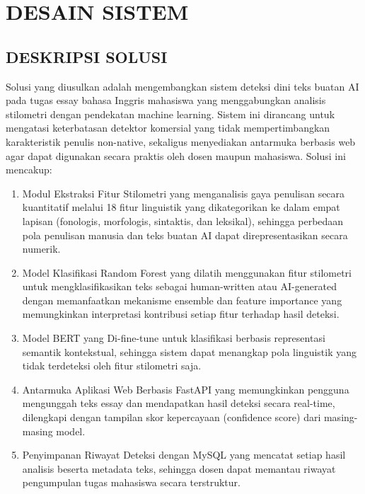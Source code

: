 \chapter{DESAIN SISTEM}

\section{DESKRIPSI SOLUSI}

Solusi yang diusulkan adalah mengembangkan sistem deteksi dini teks buatan AI pada tugas essay bahasa Inggris mahasiswa yang menggabungkan analisis stilometri dengan pendekatan machine learning. Sistem ini dirancang untuk mengatasi keterbatasan detektor komersial yang tidak mempertimbangkan karakteristik penulis non-native, sekaligus menyediakan antarmuka berbasis web agar dapat digunakan secara praktis oleh dosen maupun mahasiswa. Solusi ini mencakup:
\begin{enumerate}
	\item Modul Ekstraksi Fitur Stilometri yang menganalisis gaya penulisan secara kuantitatif melalui 18 fitur linguistik yang dikategorikan ke dalam empat lapisan (fonologis, morfologis, sintaktis, dan leksikal), sehingga perbedaan pola penulisan manusia dan teks buatan AI dapat direpresentasikan secara numerik.
	\item Model Klasifikasi Random Forest yang dilatih menggunakan fitur stilometri untuk mengklasifikasikan teks sebagai human-written atau AI-generated dengan memanfaatkan mekanisme ensemble dan feature importance yang memungkinkan interpretasi kontribusi setiap fitur terhadap hasil deteksi.
	\item Model BERT yang Di-fine-tune untuk klasifikasi berbasis representasi semantik kontekstual, sehingga sistem dapat menangkap pola linguistik yang tidak terdeteksi oleh fitur stilometri saja.
	\item Antarmuka Aplikasi Web Berbasis FastAPI yang memungkinkan pengguna mengunggah teks essay dan mendapatkan hasil deteksi secara real-time, dilengkapi dengan tampilan skor kepercayaan (confidence score) dari masing-masing model.
	\item Penyimpanan Riwayat Deteksi dengan MySQL yang mencatat setiap hasil analisis beserta metadata teks, sehingga dosen dapat memantau riwayat pengumpulan tugas mahasiswa secara terstruktur.
\end{enumerate}

